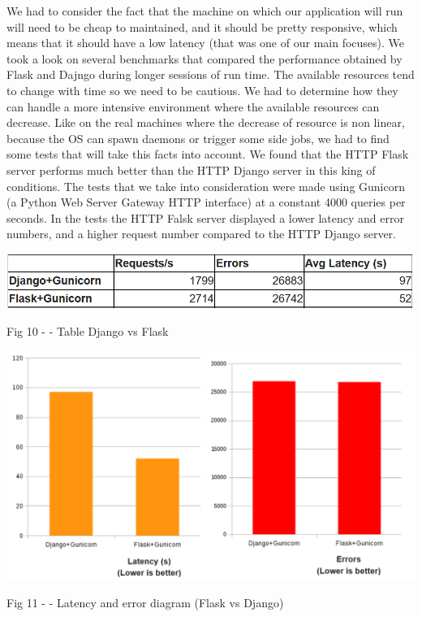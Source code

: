 \documentclass[12pt, a4paper]{report}
\begin{document}
We had to consider the fact that the machine on which our application will run will need to be cheap to maintained, and it should be pretty responsive, which means that it should have a low latency (that was one of our main focuses). We took a look on several benchmarks that compared the performance obtained by Flask and Dajngo during longer sessions of run time. The available resources tend to change with time so we need to be cautious. We had to determine how they can handle a more intensive environment where the available resources can decrease. Like on the real machines where the decrease of resource is non linear, because the OS can spawn daemons or trigger some side jobs, we had to find some tests that will take this facts into account. We found that the HTTP Flask server performs much better than the HTTP Django server in this king of conditions. The tests that we take into consideration \cite{Flask2} were made using Gunicorn (a Python Web Server Gateway HTTP interface) at a constant 4000 queries per seconds. In the tests the HTTP Falsk server displayed a lower latency and error numbers, and a higher request number compared to the HTTP Django server.
\par 

\bigskip
\includegraphics[scale=0.7, center]{django-flask-table.png}
\begin{center}
Fig 10 - \cite{Flask2} - Table Django vs Flask 
\end{center}

\medskip
\includegraphics[scale=0.6, center]{django-flask-latency.png}
\begin{center}
Fig 11 - \cite{Flask2} - Latency and error diagram (Flask vs Django)
\end{center}
\end{document}
